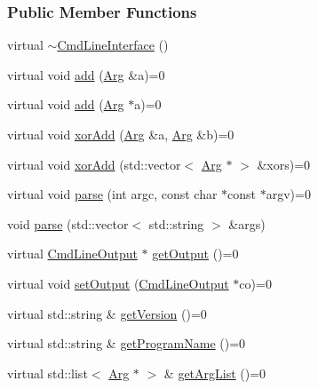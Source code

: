 \subsubsection*{Public Member Functions}
\begin{DoxyCompactItemize}
\item 
virtual \hyperlink{classTCLAP_1_1CmdLineInterface_a8c7faeca5a25a96e18312da9485a94e9}{$\sim$\+Cmd\+Line\+Interface} ()
\item 
virtual void \hyperlink{classTCLAP_1_1CmdLineInterface_a13b29ab754c030185e58f779dc355631}{add} (\hyperlink{classTCLAP_1_1Arg}{Arg} \&a)=0
\item 
virtual void \hyperlink{classTCLAP_1_1CmdLineInterface_a7c6a097c0f2a09dd1987e9da1af8b457}{add} (\hyperlink{classTCLAP_1_1Arg}{Arg} $\ast$a)=0
\item 
virtual void \hyperlink{classTCLAP_1_1CmdLineInterface_a69859e3713623eb06c9c335248d9c83f}{xor\+Add} (\hyperlink{classTCLAP_1_1Arg}{Arg} \&a, \hyperlink{classTCLAP_1_1Arg}{Arg} \&b)=0
\item 
virtual void \hyperlink{classTCLAP_1_1CmdLineInterface_a6a94140e522bcf6104928fcf0c434ab8}{xor\+Add} (std\+::vector$<$ \hyperlink{classTCLAP_1_1Arg}{Arg} $\ast$ $>$ \&xors)=0
\item 
virtual void \hyperlink{classTCLAP_1_1CmdLineInterface_a6649336bddfc8421148718a691fd89b4}{parse} (int argc, const char $\ast$const $\ast$argv)=0
\item 
void \hyperlink{classTCLAP_1_1CmdLineInterface_a1b1a0cb973206a11c22003c245a4f7ed}{parse} (std\+::vector$<$ std\+::string $>$ \&args)
\item 
virtual \hyperlink{classTCLAP_1_1CmdLineOutput}{Cmd\+Line\+Output} $\ast$ \hyperlink{classTCLAP_1_1CmdLineInterface_aebc72daedeaeb03e06bb2e6e0f00363d}{get\+Output} ()=0
\item 
virtual void \hyperlink{classTCLAP_1_1CmdLineInterface_ab208b32bd9489781509d7ecddf8a92a0}{set\+Output} (\hyperlink{classTCLAP_1_1CmdLineOutput}{Cmd\+Line\+Output} $\ast$co)=0
\item 
virtual std\+::string \& \hyperlink{classTCLAP_1_1CmdLineInterface_a0a552fa57212800dfb8aec84fb07b8bb}{get\+Version} ()=0
\item 
virtual std\+::string \& \hyperlink{classTCLAP_1_1CmdLineInterface_a1a5672df72a6b5021cd70b37c4dbd0a7}{get\+Program\+Name} ()=0
\item 
virtual std\+::list$<$ \hyperlink{classTCLAP_1_1Arg}{Arg} $\ast$ $>$ \& \hyperlink{classTCLAP_1_1CmdLineInterface_a4de8d988f5a6f3007c4dfb0fc9dad476}{get\+Arg\+List} ()=0

\end{DoxyCompactItemize}
